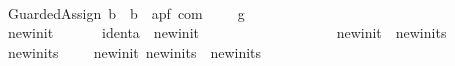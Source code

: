 \begin{isabellebody}
\ \ \ \ \ \ \ \ \ \ \ \ \ \ \ \ \ \ \ \ \ \ \ \ \ \ \ \ \ \ \ \ \ \ \ \ \ \ \ \ \ \ \ \ \ {\isacharparenleft}{\isachardoublequoteopen}{\isacharparenleft}{\isasymacute}{\isacharunderscore}\ {\isacharcolon}{\isacharequal}{\isacharequal}\isactrlbsub {\isacharunderscore}\isactrlesub {\isacharslash}\ {\isacharunderscore}{\isacharparenright}{\isachardoublequoteclose}\ {\isacharbrackleft}{}{}{\isacharcomma}{}{}{}{}{\isacharcomma}\ {}{}{\isacharbrackright}\ {}{}{\isacharparenright}\isanewline
\ \ {\isachardoublequoteopen}{\isacharunderscore}GuardedAssign{\isachardoublequoteclose}{\isacharcolon}{\isacharcolon}\ {\isachardoublequoteopen}{\isacharprime}b\ {\isacharequal}{\isachargreater}\ {\isacharprime}b\ {\isacharequal}{\isachargreater}\ {\isacharparenleft}{\isacharprime}a{\isacharcomma}{\isacharprime}p{\isacharcomma}{\isacharprime}f{\isacharparenright}\ com{\isachardoublequoteclose}\ \ \ \ {\isacharparenleft}{\isachardoublequoteopen}{\isacharparenleft}{\isacharunderscore}\ {\isacharcolon}{\isacharequal}{\isacharequal}\isactrlsub g{\isacharslash}\ {\isacharunderscore}{\isacharparenright}{\isachardoublequoteclose}\ {\isacharbrackleft}{}{}{\isacharcomma}\ {}{}{\isacharbrackright}\ {}{}{\isacharparenright}\isanewline
\ \ {\isachardoublequoteopen}{\isacharunderscore}newinit{\isachardoublequoteclose}\ \ \ \ \ \ {\isacharcolon}{\isacharcolon}\ {\isachardoublequoteopen}{\isacharbrackleft}ident{\isacharcomma}{\isacharprime}a{\isacharbrackright}\ {\isasymRightarrow}\ newinit{\isachardoublequoteclose}\ {\isacharparenleft}{\isachardoublequoteopen}{\isacharparenleft}{}{\isasymacute}{\isacharunderscore}\ {\isacharcolon}{\isacharequal}{\isacharequal}{\isacharslash}\ {\isacharunderscore}{\isacharparenright}{\isachardoublequoteclose}{\isacharparenright}\isanewline
\ \ {\isachardoublequoteopen}{\isachardoublequoteclose}\ \ \ \ \ \ \ \ \ \ \ \ \ {\isacharcolon}{\isacharcolon}\ {\isachardoublequoteopen}newinit\ {\isasymRightarrow}\ newinits{\isachardoublequoteclose}\ \ \ \ {\isacharparenleft}{\isachardoublequoteopen}{\isacharunderscore}{\isachardoublequoteclose}{\isacharparenright}\isanewline
\ \ {\isachardoublequoteopen}{\isacharunderscore}newinits{\isachardoublequoteclose}\ \ \ \ {\isacharcolon}{\isacharcolon}\ {\isachardoublequoteopen}{\isacharbrackleft}newinit{\isacharcomma}\ newinits{\isacharbrackright}\ {\isasymRightarrow}\ newinits{\isachardoublequoteclose}\ {\isacharparenleft}{\isachardoublequoteopen}{\isacharunderscore}{\isacharcomma}{\isacharslash}\ {\isacharunderscore}{\isachardoublequoteclose}{\isacharparenright}\isanewline

\end{isabellebody}
